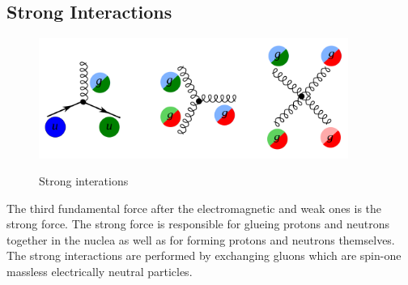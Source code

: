 \subsection{Strong Interactions}
\label{sec:Intro_QCD}

\begin{figure}[htb]
  \begin{center}
    {\includegraphics[width=0.90\textwidth]{../figs/Intro/feynmStrong.png}}
    \caption{Strong interations}
    \label{fig:feynmStrong}
  \end{center}
\end{figure}


The third fundamental force after the electromagnetic and weak ones is the strong force. The strong force is responsible for glueing protons and neutrons together in the nuclea as well as for forming protons and neutrons themselves. The strong interactions are performed by exchanging gluons which are spin-one massless electrically neutral particles.  \\

